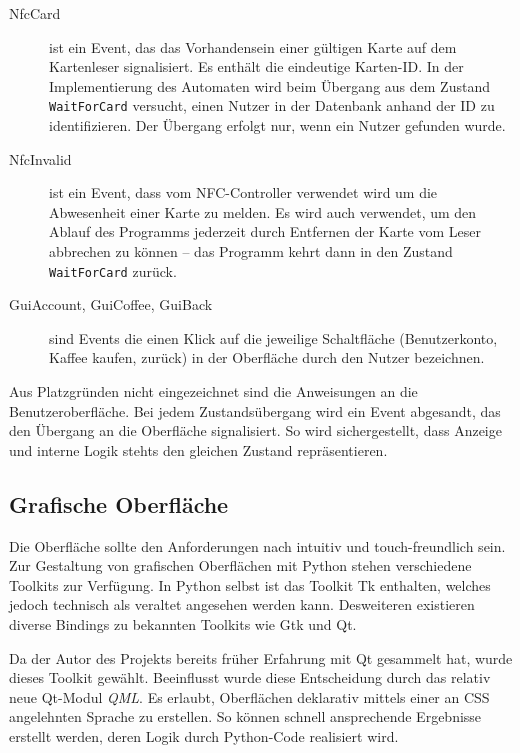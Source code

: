 \documentclass[11pt,a4paper]{IEEEtran}
\begin{document}
\begin{description}
    \item[NfcCard] ist ein Event, das das Vorhandensein einer gültigen
        Karte auf dem Kartenleser signalisiert. Es enthält die eindeutige 
        Karten-ID. In der Implementierung des Automaten wird beim Übergang aus
        dem Zustand \texttt{WaitForCard} versucht, einen Nutzer in der
        Datenbank anhand der ID zu identifizieren. Der Übergang erfolgt nur,
        wenn ein Nutzer gefunden wurde.
    \item[NfcInvalid] ist ein Event, dass vom NFC-Controller verwendet wird
        um die Abwesenheit einer Karte zu melden. Es wird auch verwendet, um 
        den Ablauf des Programms jederzeit durch Entfernen der Karte vom Leser
        abbrechen zu können -- das Programm kehrt dann in den Zustand
        \texttt{WaitForCard} zurück.
    \item[GuiAccount, GuiCoffee, GuiBack] sind Events die einen Klick auf die
        jeweilige Schaltfläche (Benutzerkonto, Kaffee kaufen, zurück) in der 
        Oberfläche durch den Nutzer bezeichnen.
\end{description}

Aus Platzgründen nicht eingezeichnet sind die Anweisungen an die
Benutzeroberfläche. Bei jedem Zustandsübergang wird ein Event abgesandt, das 
den Übergang an die Oberfläche signalisiert. So wird sichergestellt, dass
Anzeige und interne Logik stehts den gleichen Zustand repräsentieren.

\subsection{Grafische Oberfläche} 
\label{sec:gui}

Die Oberfläche sollte den Anforderungen nach intuitiv und touch-freundlich
sein. Zur Gestaltung von grafischen Oberflächen mit Python stehen verschiedene
Toolkits zur Verfügung. In Python selbst ist das Toolkit Tk enthalten, welches
jedoch technisch als veraltet angesehen werden kann. Desweiteren existieren
diverse Bindings zu bekannten Toolkits wie Gtk und Qt. 

Da der Autor des Projekts bereits früher Erfahrung mit Qt gesammelt hat, wurde 
dieses Toolkit gewählt. Beeinflusst wurde diese Entscheidung durch das relativ
neue Qt-Modul \emph{QML}. Es erlaubt, Oberflächen deklarativ mittels einer an
CSS angelehnten Sprache zu erstellen. So können schnell ansprechende Ergebnisse
erstellt werden, deren Logik durch Python-Code realisiert wird.
\end{document}
